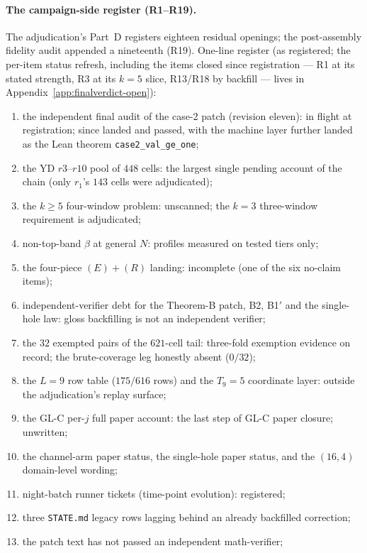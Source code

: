 \paragraph{The campaign-side register (R1--R19).} The adjudication's Part~D registers
eighteen residual openings; the post-assembly fidelity audit appended a nineteenth (R19).
One-line register (as registered; the per-item status refresh, including the items closed
since registration --- R1 at its stated strength, R3 at its $k=5$ slice, R13/R18 by backfill
--- lives in Appendix~\ref{app:finalverdict-open}):
\begin{enumerate}[label=\textbf{R\arabic*.},leftmargin=2.6em,itemsep=0.05em]
\item the independent final audit of the case-2 patch (revision eleven): in flight at
  registration; since landed and passed, with the machine layer further landed as the Lean
  theorem \texttt{case2\_val\_ge\_one};
\item the YD $r3$--$r10$ pool of $448$ cells: the largest single pending account of the chain
  (only $r_1$'s $143$ cells were adjudicated);
\item the $k\ge5$ four-window problem: unscanned; the $k=3$ three-window requirement is
  adjudicated;
\item non-top-band $\beta$ at general $N$: profiles measured on tested tiers only;
\item the four-piece $(E)+(R)$ landing: incomplete (one of the six no-claim items);
\item independent-verifier debt for the Theorem-B patch, B2, B1$'$ and the single-hole law:
  gloss backfilling is not an independent verifier;
\item the $32$ exempted pairs of the $621$-cell tail: three-fold exemption evidence on
  record; the brute-coverage leg honestly absent ($0/32$);
\item the $L=9$ row table ($175/616$ rows) and the $T_9=5$ coordinate layer: outside the
  adjudication's replay surface;
\item the GL-C per-$j$ full paper account: the last step of GL-C paper closure; unwritten;
\item the channel-arm paper status, the single-hole paper status, and the $(16,4)$
  domain-level wording;
\item night-batch runner tickets (time-point evolution): registered;
\item three \texttt{STATE.md} legacy rows lagging behind an already backfilled correction;
\item the patch text has not passed an independent math-verifier;

\end{enumerate}
